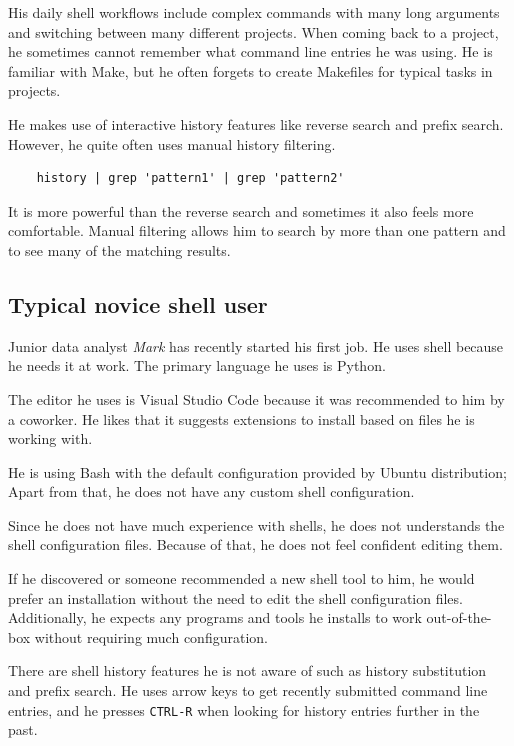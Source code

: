 His daily shell workflows include complex commands with many long arguments and switching between many different projects. When coming back to a project, he sometimes cannot remember what command line entries he was using. He is familiar with Make, but he often forgets to create Makefiles for typical tasks in projects.

He makes use of interactive history features like reverse search and prefix search. However, he quite often uses manual history filtering.

\begin{verbatim}
    history | grep 'pattern1' | grep 'pattern2'     
\end{verbatim}

It is more powerful than the reverse search and sometimes it also feels more comfortable. Manual filtering allows him to search by more than one pattern and to see many of the matching results. 

\subsection{Typical novice shell user}

Junior data analyst \textit{Mark} has recently started his first job. He uses shell because he needs it at work. The primary language he uses is Python. 

The editor he uses is Visual Studio Code because it was recommended to him by a coworker. He likes that it suggests extensions to install based on files he is working with.

He is using Bash with the default configuration provided by Ubuntu distribution; Apart from that, he does not have any custom shell configuration. 

Since he does not have much experience with shells, he does not understands the shell configuration files. Because of that, he does not feel confident editing them. 

If he discovered or someone recommended a new shell tool to him, he would prefer an installation without the need to edit the shell configuration files. Additionally, he expects any programs and tools he installs to work out-of-the-box without requiring much configuration. 

There are shell history features he is not aware of such as history substitution and prefix search. He uses arrow keys to get recently submitted command line entries, and he presses \verb|CTRL-R| when looking for history entries further in the past. 


